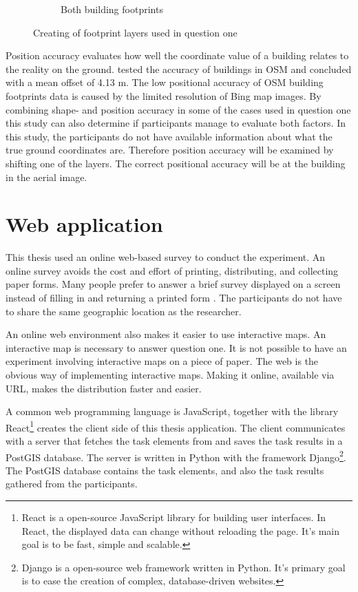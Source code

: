 \begin{figure}[H]
\begin{subfigure}[b]{0.32\textwidth}
		\caption{Both building footprints}
		\label{fig:build3.jpg}
	\end{subfigure}
	\caption{Creating of footprint layers used in question one}
	\label{fig:building_creation_example}
\end{figure}

Position accuracy evaluates how well the coordinate value of a building relates to the reality on the ground. \cite{Fan2014} tested the accuracy of buildings in OSM and concluded with a mean offset of 4.13 m. The low positional accuracy of OSM building footprints data is caused by the limited resolution of Bing map images. By combining shape- and position accuracy in some of the cases used in question one this study can also determine if participants manage to evaluate both factors. In this study, the participants do not have available information about what the true ground coordinates are. Therefore position accuracy will be examined by shifting one of the layers. The correct positional accuracy will be at the building in the aerial image. 

\section{Web application}
This thesis used an online web-based survey to conduct the experiment. An online survey avoids the cost and effort of printing, distributing, and collecting paper forms. Many people prefer to answer a brief survey displayed on a screen instead of filling in and returning a printed form \citep{Ben2009}. The participants do not have to share the same geographic location as the researcher. 

An online web environment also makes it easier to use interactive maps. An interactive map is necessary to answer question one. It is not possible to have an experiment involving interactive maps on a piece of paper. The web is the obvious way of implementing interactive maps. Making it online, available via URL, makes the distribution faster and easier.

A common web programming language is JavaScript, together with the library React\footnote{React is a open-source JavaScript library for building user interfaces. In React, the displayed data can change without reloading the page. It's main goal is to be fast, simple and scalable.} creates the client side of this thesis application. The client communicates with a server that fetches the task elements from and saves the task results in a PostGIS database. The server is written in Python with the framework Django\footnote{Django is a open-source web framework written in Python. It's primary goal is to ease the creation of complex, database-driven websites.}. The PostGIS database contains the task elements, and also the task results gathered from the participants. 
 
